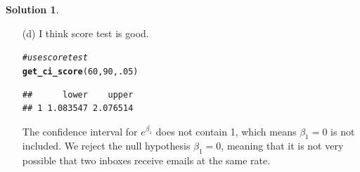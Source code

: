 \documentclass[11pt,letterpaper,english,oneside]{article}\usepackage[]{graphicx}\usepackage[]{color}
\makeatletter
\newcommand{\hlnum}[1]{\textcolor[rgb]{0.686,0.059,0.569}{#1}}%
\newcommand{\hlcom}[1]{\textcolor[rgb]{0.678,0.584,0.686}{\textit{#1}}}%
\newcommand{\hlstd}[1]{\textcolor[rgb]{0.345,0.345,0.345}{#1}}%
\newcommand{\hlkwd}[1]{\textcolor[rgb]{0.737,0.353,0.396}{\textbf{#1}}}%
\newenvironment{kframe}{%
 \def\at@end@of@kframe{}%
 \ifinner\ifhmode%
  \def\at@end@of@kframe{\end{minipage}}%
  \begin{minipage}{\columnwidth}%
 \fi\fi%
 \def\FrameCommand##1{\hskip\@totalleftmargin \hskip-\fboxsep
 \colorbox{shadecolor}{##1}\hskip-\fboxsep
     \hskip-\linewidth \hskip-\@totalleftmargin \hskip\columnwidth}%
 \MakeFramed {\advance\hsize-\width
   \@totalleftmargin\z@ \linewidth\hsize
   \@setminipage}}%
 {\par\unskip\endMakeFramed%
 \at@end@of@kframe}
\newenvironment{knitrout}{}{} %
\theoremstyle{definition} %
\newtheorem{solution}{Solution}
\newenvironment{sol}{\begin{solution}\hspace{0pt}}{\end{solution}}
\makeatother
\begin{document}
\begin{sol}
\begin{enumerate}
\item[(d)]
I think score test is good.

\begin{knitrout}
\color{fgcolor}\begin{kframe}
\begin{alltt}
\hlcom{#use score test}
\hlkwd{get_ci_score}\hlstd{(}\hlnum{60}\hlstd{,}\hlnum{90}\hlstd{,}\hlnum{.05}\hlstd{)}
\end{alltt}
\begin{verbatim}
##      lower    upper
## 1 1.083547 2.076514
\end{verbatim}
\end{kframe}
\end{knitrout}

The confidence interval for $e^{\beta_1}$ does not contain 1, which means $\beta_1=0$ is not included. We reject the null hypothesis $\beta_1=0$, meaning that it is not very possible that two inboxes receive emails at the same rate.

\end{enumerate}
\end{sol}
\end{document}
